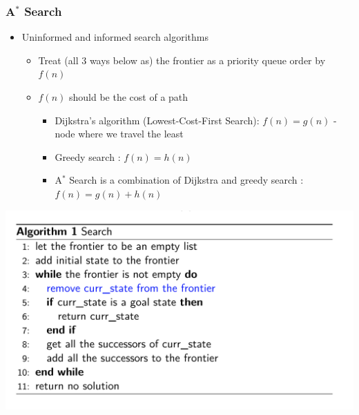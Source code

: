 \documentclass{article}
\begin{document}
\subsubsection{A\({}^*\) Search}
\begin{itemize}
\item Uninformed and informed search algorithms
\begin{itemize}
\item Treat (all 3 ways below as) the frontier as a priority queue order by \(f(n)\)
\item \(f(n)\) should be the cost of a path
\begin{itemize}
\item Dijkstra’s algorithm (Lowest-Cost-First Search): \(f(n) = g(n)\) - node where we travel the least
\item Greedy search : \(f(n) = h(n)\) 
\item A\({}^*\) Search is a combination of Dijkstra and greedy search : \(f(n) = g(n) + h(n)\)
\end{itemize}
\end{itemize}
\end{itemize}

\begin{center}
\includegraphics[scale=0.3]{1}
\end{center}
\end{document}
